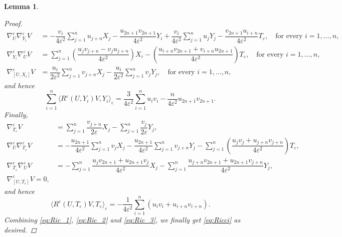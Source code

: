 \documentclass[10pt]{amsart}
\numberwithin{equation}{section}
\newtheorem{lemma}[theorem]{Lemma}
\theoremstyle{definition}
\begin{document}
\begin{lemma}
\begin{proof}
\begin{align*}
\nabla^{\varepsilon}_{U}\nabla^{\varepsilon}_{Y_i}V &= - \dfrac{v_{i}}{4\varepsilon^2}\sum_{j=1}^{n}u_{j+n}X_j 
-\dfrac{u_{2n+1}v_{2n+1}}{4\varepsilon^2}Y_i +\dfrac{v_i}{4\varepsilon^2} \sum_{j=1}^{n}u_j Y_j - \dfrac{v_{2n+1}u_{i+n}}{4\varepsilon^2}T_{\varepsilon}, \quad \textrm{for every } i =1,\ldots,n,\\
\nabla^{\varepsilon}_{Y_i}\nabla^{\varepsilon}_{U}V &=\sum_{j=1}^{n}\left(\dfrac{u_j v_{j+n} - v_j u_{j+n}}{4\varepsilon^2}\right)X_i - \left(\dfrac{u_{i+n} v_{2n+1}+v_{i+n} u_{2n+1}}{4\varepsilon^2}\right) T_{\varepsilon}, \quad \textrm{for every } i =1,\ldots,n,\\
\nabla^{\varepsilon}_{[U,X_i]}V &=\dfrac{u_{i}}{2\varepsilon^2}\sum_{j=1}^{n}v_{j+n}X_j -\dfrac{u_{i}}{2\varepsilon^2}\sum_{j=1}^{n}v_{j}Y_j, \quad \textrm{for every } i =1,\ldots,n,
\end{align*}
\noindent and hence
\begin{equation}\label{eq:Ric_2}
\sum_{i=1}^{n} \langle R^{\varepsilon}(U,Y_i)V,Y_i \rangle_{\varepsilon} = \dfrac{3}{4\varepsilon^2}\sum_{i=1}^{n}u_{i}v_{i} - \dfrac{n}{4\varepsilon^2}u_{2n+1}v_{2n+1}.
\end{equation}
Finally,
\begin{align*}
\nabla^{\varepsilon}_{T_{\varepsilon}}V &= \sum_{j=1}^{n}\dfrac{v_{j+n}}{2\varepsilon}X_j - \sum_{j=1}^{n}\dfrac{v_{j}}{2\varepsilon}Y_j,\\
\nabla^{\varepsilon}_{U}\nabla^{\varepsilon}_{T_{\varepsilon}}V &= -\dfrac{u_{2n+1}}{4\varepsilon^2}\sum_{j=1}^{n}v_j X_j - \dfrac{u_{2n+1}}{4\varepsilon^2}\sum_{j=1}^{n}v_{j+n}Y_j - \sum_{j=1}^{n}\left(\dfrac{u_j v_j + u_{j+n}v_{j+n}}{4\varepsilon^2}\right)T_{\varepsilon},\\
\nabla^{\varepsilon}_{T_{\varepsilon}}\nabla^{\varepsilon}_{U}V &= -\sum_{j=1}^{n}\dfrac{u_{j}v_{2n+1}+u_{2n+1}v_{j}}{4\varepsilon^2} X_j-\sum_{j=1}^{n}\dfrac{u_{j+n}v_{2n+1}+u_{2n+1}v_{j+n}}{4\varepsilon^2}Y_j,\\
\nabla^{\varepsilon}_{[U,T_{\varepsilon}]}V=0,
\end{align*}
\noindent and hence
\begin{equation}\label{eq:Ric_3}
\langle R^{\varepsilon}(U,T_{\varepsilon})V,T_{\varepsilon}\rangle_{\varepsilon} = -\dfrac{1}{4\varepsilon^2}\sum_{i=1}^{n}(u_{i}v_{i} +u_{i+n}v_{i+n}).
\end{equation}
Combining \eqref{eq:Ric_1}, \eqref{eq:Ric_2} and \eqref{eq:Ric_3}, we finally get \eqref{eq:Ricci} as desired.
\end{proof}
\end{lemma}
\end{document}

